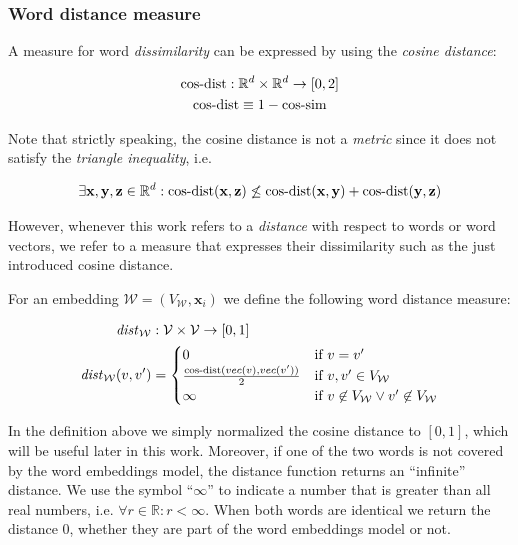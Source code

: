 \subsubsection{Word distance measure}
A measure for word \emph{dissimilarity} can be expressed by
using the \emph{cosine distance}:

\begin{gather*}
\mathit{\text{cos-dist}}: \mathbb{R}^d \times \mathbb{R}^d \to [0, 2] \\
\mathit{\text{cos-dist}} \equiv 1 - \mathit{\text{cos-sim}}
\end{gather*}

Note that strictly speaking, the cosine distance is not
a \emph{metric} since it does not satisfy the \emph{triangle
inequality}, i.e.

\begin{equation*}
\exists \mathbf{x},\mathbf{y},\mathbf{z} \in \mathbb{R}^d:
\mathit{\text{cos-dist}}(\mathbf{x},\mathbf{z}) \not\leq
\mathit{\text{cos-dist}}(\mathbf{x},\mathbf{y}) +
\mathit{\text{cos-dist}}(\mathbf{y},\mathbf{z})
\end{equation*}

However, whenever this work refers to a \emph{distance} with respect to
words or word vectors, we refer to a measure that expresses their dissimilarity
such as the just introduced cosine distance.

For an embedding $\mathcal{W}=(V_{\mathcal{W}}, \mathbf{x}_i)$ we define the
following word distance measure:

\begin{equation*}
\begin{split}
\mathit{dist}_\mathcal{W} &: \mathcal{V}\times \mathcal{V} \to [0,1] \\
\mathit{dist}_\mathcal{W}(v,v') &= \begin{cases} 0 & \text{if~} v=v' \\
\frac{\mathit{\text{cos-dist}}(vec(v),vec(v'))}{2} & \text{if~} v,v' \in
V_{\mathcal{W}}
\\
\infty & \text{if~} v \not\in V_{\mathcal{W}} \lor v' \not\in V_{\mathcal{W}}
\end{cases}
\end{split}
\end{equation*}

In the definition above we simply normalized the cosine distance to $[0,1]$,
which will be useful later in this work. Moreover, if one of the two words
is not covered by the word embeddings model, the distance function
returns an ``infinite'' distance. We use the symbol ``$\infty$''
to indicate a number that is greater than all real numbers, i.e. $\forall r
\in\mathbb{R}: r < \infty$. When both words are identical we
return the distance $0$, whether they are part of the word embeddings model or
not.


